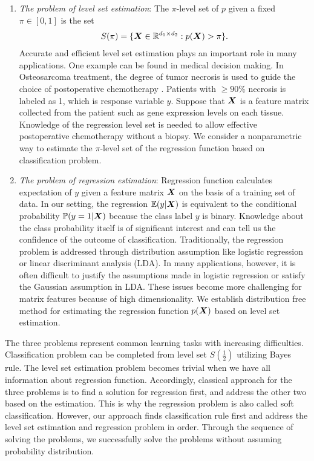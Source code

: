 \documentclass[12pt]{article}
\begin{document}
\begin{enumerate}[label={2.\arabic*}]
\item {\it The problem of level set estimation}: The $\pi$-level set of $p$ given a fixed $\pi\in[0,1]$ is the set 
\begin{align}
S(\pi) = \{\bm X\in\mathbb{R}^{d_1\times d_2}: p(\bm X)>\pi\}.
\end{align}
 Accurate and efficient level set estimation plays an important role in many applications.
 One example can be found in medical decision making. In Osteosarcoma treatment, the degree of tumor necrosis is used to guide the choice of postoperative chemotherapy \citep{man2005expression}. Patients with $\geq 90 \%$ necrosis is labeled as 1, which is response variable $y$. Suppose that $\bm X$ is a feature matrix collected from the patient such as gene expression levels on each tissue. Knowledge of the regression level set is needed to allow effective postoperative chemotherapy without a biopsy. 
 We consider a nonparametric way to estimate the $\pi$-level set of the regression function based on classification problem.
\item {\it The problem of regression estimation}: Regression function calculates expectation of $y$ given a feature matrix $\bm X$ on the basis of a training set of data. In our setting, the regression $ \mathbb{E}(y|\bm X)$  is equivalent to  the conditional probability $\mathbb{P}(y = 1|\bm X)$ because the class label $y$ is binary. Knowledge about the class probability itself is of significant interest and can tell us the confidence of the outcome of classification. Traditionally, the regression problem is addressed 
through distribution assumption like logistic regression or linear discriminant analysis (LDA). In many applications, however, it is often difficult to  justify the assumptions made in logistic regression or satisfy the Gaussian assumption in LDA. These issues become more challenging for matrix features because of high dimensionality.
We establish distribution free method for estimating the regression function $p(\bm X)$ based on level set estimation.  

\end{enumerate}
The three problems represent common learning tasks with increasing difficulties. 
Classification problem can be completed from level set $S(\frac{1}{2})$ utilizing Bayes rule. The level set estimation problem becomes trivial when we have all information about regression function.  
Accordingly, classical approach for the three problems is to find a solution for regression first, and address the other two based on the estimation. This is why the regression problem is also called soft classification. However, our approach finds classification rule first and address the level set estimation and regression problem in order. Through the sequence of solving the problems, we successfully solve the problems without assuming probability distribution.
\end{document}
